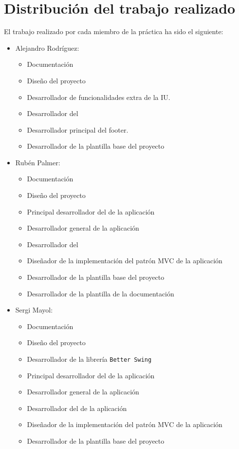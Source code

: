 \section{Distribución del trabajo realizado}

El trabajo realizado por cada miembro de la práctica ha sido el siguiente: \bigskip

\begin{itemize}
    \item Alejandro Rodríguez:
    \begin{itemize}
        \item Documentación
        \item Diseño del proyecto
        \item Desarrollador de funcionalidades extra de la IU.
        \item Desarrollador del 
        \item Desarrollador principal del footer.
        \item Desarrollador de la plantilla base del proyecto
    \end{itemize}
    
    \item Rubén Palmer:
    \begin{itemize}
        \item Documentación
        \item Diseño del proyecto
        \item Principal desarrollador del  de la aplicación
        \item Desarrollador general de la aplicación
        \item Desarrollador del 
        \item Diseñador de la implementación del patrón MVC de la aplicación
        \item Desarrollador de la plantilla base del proyecto
        \item Desarrollador de la plantilla de la documentación 
    \end{itemize}
    \item Sergi Mayol:
    \begin{itemize}
        \item Documentación
        \item Diseño del proyecto
        \item Desarrollador de la librería \texttt{Better Swing}
        \item Principal desarrollador del  de la aplicación
        \item Desarrollador general de la aplicación
        \item Desarrollador del  de la aplicación
        \item Diseñador de la implementación del patrón MVC de la aplicación
        \item Desarrollador de la plantilla base del proyecto
    \end{itemize}
\end{itemize}

